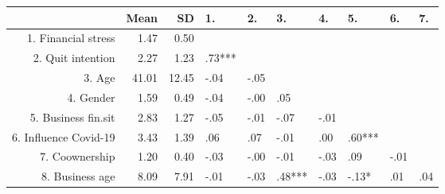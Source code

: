 \begin{table}[ht]
\centering
\begin{tabular}{rrrlllllll}
  \hline
 & Mean & SD & 1. & 2. & 3. & 4. & 5. & 6. & 7. \\ 
  \hline
1. Financial stress & 1.47 & 0.50 &  &  &  &  &  &  &  \\ 
  2. Quit intention & 2.27 & 1.23 & .73***  &  &  &  &  &  &  \\ 
  3. Age & 41.01 & 12.45 & -.04     & -.05     &  &  &  &  &  \\ 
  4. Gender & 1.59 & 0.49 & -.04     & -.00     & .05     &  &  &  &  \\ 
  5. Business fin.sit & 2.83 & 1.27 & -.05     & -.01     & -.07     & -.01     &  &  &  \\ 
  6. Influence Covid-19 & 3.43 & 1.39 & .06     & .07     & -.01     & .00     & .60***  &  &  \\ 
  7. Coownership & 1.20 & 0.40 & -.03     & -.00     & -.01     & -.03     & .09     & -.01     &  \\ 
  8. Business age & 8.09 & 7.91 & -.01     & -.03     & .48***  & -.03     & -.13*    & .01     & .04     \\ 
   \hline
\end{tabular}
\end{table}
